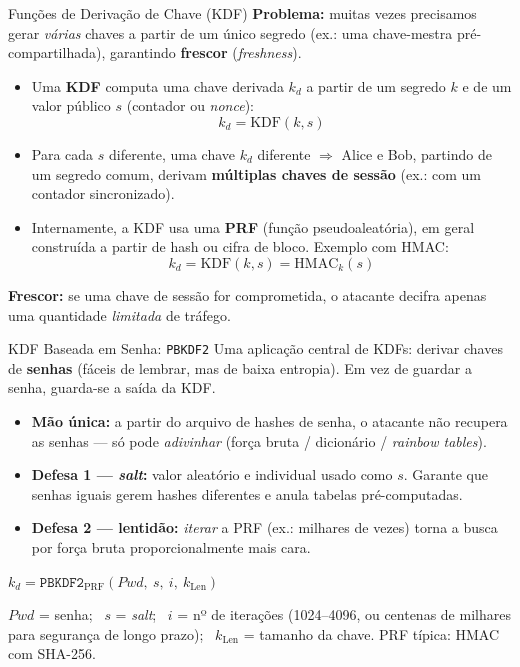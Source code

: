 \documentclass{beamer}
\begin{document}
\begin{frame}{Funções de Derivação de Chave (KDF)}
    \textbf{Problema:} muitas vezes precisamos gerar \emph{várias} chaves a partir de um único segredo (ex.: uma chave-mestra pré-compartilhada), garantindo \textbf{frescor} (\textit{freshness}).
    \medskip
    \begin{itemize}
        \footnotesize
        \item Uma \textbf{KDF} computa uma chave derivada $k_d$ a partir de um segredo $k$ e de um valor público $s$ (contador ou \textit{nonce}):
        \[
            k_d = \text{KDF}(k, s)
        \]
        \item Para cada $s$ diferente, uma chave $k_d$ diferente $\Rightarrow$ Alice e Bob, partindo de um segredo comum, derivam \textbf{múltiplas chaves de sessão} (ex.: com um contador sincronizado).
        \item Internamente, a KDF usa uma \textbf{PRF} (função pseudoaleatória), em geral construída a partir de hash ou cifra de bloco. Exemplo com HMAC:
        \[
            k_d = \text{KDF}(k, s) = \text{HMAC}_k(s)
        \]
    \end{itemize}
    \medskip
    \begin{tcolorbox}[colback=blue!5,colframe=blue!50!black,boxrule=0.5pt]
        \footnotesize
        \textbf{Frescor:} se uma chave de sessão for comprometida, o atacante decifra apenas uma quantidade \emph{limitada} de tráfego.
    \end{tcolorbox}
\end{frame}

\begin{frame}{KDF Baseada em Senha: \texttt{PBKDF2}}
    Uma aplicação central de KDFs: derivar chaves de \textbf{senhas} (fáceis de lembrar, mas de baixa entropia). Em vez de guardar a senha, guarda-se a saída da KDF.
    \medskip
    \begin{itemize}
        \footnotesize
        \item \textbf{Mão única:} a partir do arquivo de hashes de senha, o atacante não recupera as senhas --- só pode \emph{adivinhar} (força bruta / dicionário / \textit{rainbow tables}).
        \item \textbf{Defesa 1 --- \textit{salt}:} valor aleatório e individual usado como $s$. Garante que senhas iguais gerem hashes diferentes e \alert{anula tabelas pré-computadas}.
        \item \textbf{Defesa 2 --- lentidão:} \emph{iterar} a PRF (ex.: milhares de vezes) torna a busca por força bruta proporcionalmente mais cara.
    \end{itemize}
    \medskip
    \begin{tcolorbox}[colback=gray!8,colframe=gray!60!black,boxrule=0.5pt]
        \centering\footnotesize
        $k_d = \texttt{PBKDF2}_{\text{PRF}}(\textit{Pwd},\ s,\ i,\ k_{\text{Len}})$
    \end{tcolorbox}
    \smallskip
    {\footnotesize $\textit{Pwd}$ = senha; \ $s$ = \textit{salt}; \ $i$ = nº de itera\c{c}ões (1024--4096, ou centenas de milhares para segurança de longo prazo); \ $k_{\text{Len}}$ = tamanho da chave. PRF típica: HMAC com SHA-256.}
\end{frame}
\end{document}
